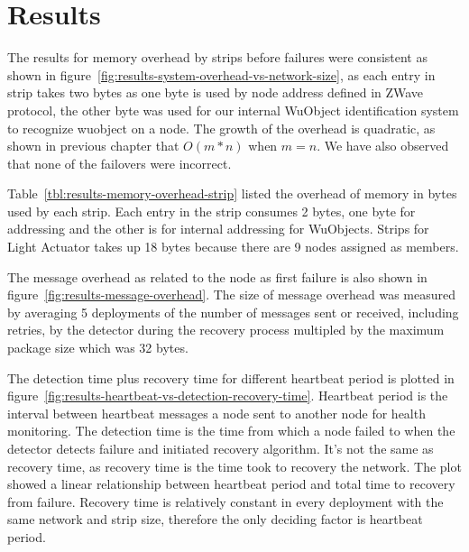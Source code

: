 




\section{Results}
\label{s:results}

The results for memory overhead by strips before failures were consistent as
shown in figure~\ref{fig:results-system-overhead-vs-network-size}, as each entry
in strip takes two bytes as one byte is used by node address defined in ZWave
protocol, the other byte was used for our internal WuObject identification
system to recognize wuobject on a node. The growth of the overhead is quadratic,
as shown in previous chapter that $O(m*n)$ when $m = n$. We have also observed
that none of the failovers were incorrect.

Table~\ref{tbl:results-memory-overhead-strip} listed the overhead of memory in
bytes used by each strip. Each entry in the strip consumes 2 bytes, one byte for
addressing and the other is for internal addressing for WuObjects. Strips for Light Actuator takes up 18 bytes because there are 9 nodes assigned as members.

The message overhead as related to the node as first failure is also shown in
figure~\ref{fig:results-message-overhead}. The size of message overhead was
measured by averaging 5 deployments of the number of messages sent or received,
including retries, by the detector during the recovery process multipled by the
maximum package size which was 32 bytes.

The detection time plus recovery time for different heartbeat period is plotted
in figure~\ref{fig:results-heartbeat-vs-detection-recovery-time}. Heartbeat
period is the interval between heartbeat messages a node sent to
another node for health monitoring. The detection time is the time from 
which a node failed to when the detector detects failure and initiated recovery
algorithm. It's not the same as recovery time, as recovery time is the time took
to recovery the network. The plot showed a linear relationship between heartbeat
period and total time to recovery from failure. Recovery time is relatively
constant in every deployment with the same network and strip size, therefore the
only deciding factor is heartbeat period. 


